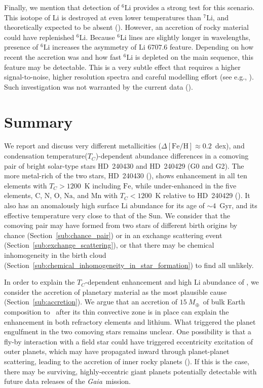 \documentclass[modern, letterpaper]{aastex61}
\newcommand{\project}[1]{\textsl{#1}}
\newcommand{\gaia}{\project{Gaia}}
\newcommand{\sectionname}{Section}
\newcommand*\elem[1]{\ensuremath{\mathrm{#1}}}
\newcommand*\elemH[1]{\ensuremath{[\mathrm{#1}/\elem{H}]}}
\newcommand*{\feh}{\ensuremath{\elemH{Fe}}}
\newcommand{\sunanalog}{\text{Krios}}
\newcommand{\bizarreone}{\text{Kronos}}
\newcommand{\Tcondens}{\ensuremath{T_C}}
\newcommand{\mearth}{\ensuremath{M_\oplus}}
\newcommand{\maccreted}{\ensuremath{15~\mearth}}
\begin{document}
Finally, we mention that detection of $^6 \elem{Li}$ provides a strong test for
this scenario.
This isotope of \elem{Li} is destroyed at even lower temperatures than
$^7\elem{Li}$, and theoretically expected to be absent
(\citealt{1997ARA&A..35..557P}).
However, an accretion of rocky material could have replenished $^6 \elem{Li}$.
Because $^6\elem{Li}$ lines are slightly longer in wavelengths,
presence of $^6\elem{Li}$ increases the asymmetry of \elem{Li} $6707.6$ feature.
Depending on how recent the accretion was and how fast $^6 \elem{Li}$ is
depleted on the main sequence, this feature may be detectable.
This is a very subtle effect that requires a higher signal-to-noise, higher
resolution spectra and careful modelling effort
(see e.g., \citealt{Israelian:2001,2002MNRAS.335.1005R}).
Such investigation was not warranted by the current data (\citealt{jmlithium}).

\section{Summary}
\label{sec:summary}

We report and discuss very different metallicities ($\Delta\feh \approx
0.2$~dex), and condensation temperature(\Tcondens)-dependent abundance
differences in a comoving pair of bright 
solar-type stars HD~240430 and HD~240429 (G0 and G2).
The more metal-rich of the two stars, HD~240430 (\bizarreone), shows enhancement in
all ten elements with $\Tcondens > 1200$~K including \elem{Fe}, while
under-enhanced in the five elements, \elem{C}, \elem{N}, \elem{O}, \elem{Na}, and
\elem{Mn} with $\Tcondens < 1200$~K relative to HD~240429 (\sunanalog).
It also has an anomalously high surface \elem{Li} abundance for its age of
$\sim 4$~Gyr, and its effective temperature very close to that of the Sun.
We consider that the comoving pair may have formed from two stars of different
birth origins by chance (\sectionname~\ref{sub:chance_pair}) or in an exchange scattering event
(\sectionname~\ref{sub:exchange_scattering}), or that there may be chemical
inhomogeneity in the birth cloud
(\sectionname~\ref{sub:chemical_inhomogeneity_in_star_formation}) to find
all unlikely.

In order to explain the $\Tcondens$-dependent enhancement and high \elem{Li}
abundance of \bizarreone, we consider the accretion of planetary material as the
most plausible cause (\sectionname~\ref{sub:accretion}).
We argue that an accretion of \maccreted\ of bulk Earth composition to
\bizarreone\ after its thin convective zone is in place can explain the
enhancement in both refractory elements and lithium.
What triggered the planet engulfment in the two comoving stars remains unclear.
One possibility is that a fly-by interaction with a field star could have
triggered eccentricity excitation of outer planets, which may
have propagated inward through planet-planet scattering, leading to the
accretion of inner rocky planets (\citealt{Zakamska:2004aa,Malmberg:2011aa}).
If this is the case, there may be surviving, highly-eccentric giant planets
potentially detectable with future data releases of the \gaia\ mission.
\end{document}
